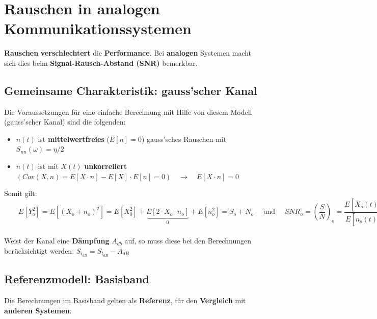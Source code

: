 \section{Rauschen in analogen Kommunikationssystemen }
\textbf{Rauschen} \textbf{verschlechtert} die \textbf{Performance}. Bei \textbf{analogen} Systemen
macht sich dies beim \textbf{Signal-Rausch-Abstand (SNR)} bemerkbar.
\subsection{Gemeinsame Charakteristik: gauss'scher Kanal}
\begin{figure}[!ht]
\begin{center}
	
\end{center}
\end{figure}

Die Voraussetzungen für eine einfache Berechnung mit Hilfe von diesem Modell (gauss'scher Kanal)
sind die folgenden:
\begin{itemize}
  \item $n(t)$ ist \textbf{mittelwertfreies} ($E[n] = 0$) gauss'sches Rauschen mit $S_{nn}(\omega) = \eta/2$
  \item $n(t)$ ist mit $X \left( t \right)$ \textbf{unkorreliert} $\left( Cov
  \left(X,n \right) = E \left[ X \cdot n \right] - E \left[ X \right] \cdot E
  \left[ n \right] = 0 \right) \quad \rightarrow \quad E[X\cdot n] = 0$
\end{itemize}
Somit gilt: $ \qquad E[Y_o^2]= E[(X_o + n_o)^2] = E[X_0^2] + \underbrace{E[2 \cdot X_o \cdot n_o]}_0 + E[n_o^2] = S_o + N_o
\quad \text{ und } \quad SNR_o = \left(\dfrac{S}{N}\right)_o = \dfrac{E[X_o(t)^2]}{E[n_o(t)^2]}$ \\ \\
Weist der Kanal eine \textbf{Dämpfung} $A_{db}$ auf, so muss diese bei den Berechnungen berücksichtigt
werden: $S_{i_{dB}} = S_{t_{dB}} - A_{dB}$



\subsection{Referenzmodell: Basisband }
Die Berechnungen im Basisband gelten als \textbf{Referenz}, für den \textbf{Vergleich} mit
\textbf{anderen Systemen}. \\

\begin{figure}[!ht]
\begin{center}
	
\end{center}
\end{figure}

